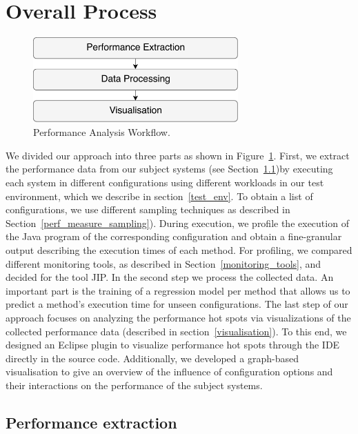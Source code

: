 \section{Overall Process}
\label{overall_process}

\begin{figure}
  \centering
  \includegraphics[width=0.7\textwidth]{images/workflow_overview_0}
  \caption{Performance Analysis Workflow.}
  \label{big_picture_perf_anal_workflow}
\end{figure}

We divided our approach into three parts as shown in Figure~\ref{big_picture_perf_anal_workflow}. First, we extract the performance data from our subject systems (see Section~\ref{perf_extr})by executing each system in different configurations using different workloads in our test environment, which we describe in section~\ref{test_env}. To obtain a list of configurations, we use different sampling techniques as described in Section~\ref{perf_measure_sampling}). During execution, we profile the execution of the Java program of the corresponding configuration and obtain a fine-granular output describing the execution times of each method. For profiling, we compared different monitoring tools, as described in Section~\ref{monitoring_tools}, and decided for the tool \ac{JIP}. In the second step we process the collected data. An important part is the training of a regression model per method that allows us to predict a method's execution time for unseen configurations. The last step of our approach focuses on analyzing the performance hot spots via visualizations of the collected performance data (described in section~\ref{visualisation}). To this end, we designed an Eclipse plugin to visualize performance hot spots through the \ac{IDE} directly in the source code. Additionally, we developed a graph-based visualisation to give an overview of the influence of configuration options and their interactions on the performance of the subject systems.


\subsection{Performance extraction}
\label{perf_extr}

